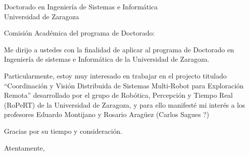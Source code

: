 \documentclass[10pt]{letter}
\begin{document}
\begin{letter}{Doctorado en Ingeniería de Sistemas e Informática\\
  Universidad de Zaragoza}

\opening{Comisión Académica del programa de Doctorado:}

Me dirijo a ustedes con la finalidad de aplicar al programa de Doctorado en
Ingeniería de sistemas e Informática de la Universidad de Zaragoza.

Particularmente, estoy muy interesado en trabajar en el projecto titulado
``Coordinación y Visión Distribuida de Sistemas Multi-Robot para Exploración
Remota'' desarrollado por el grupo de Robótica, Percepción y Tiempo Real
(RoPeRT) de la Universidad de Zaragoza, y para ello manifesté mi interés a los
profesores Eduardo Montijano y Rosario Aragüez (Carlos Sagues ?)

Gracias por su tiempo y consideración.

\closing{Atentamente,}


\end{letter}
\end{document}
